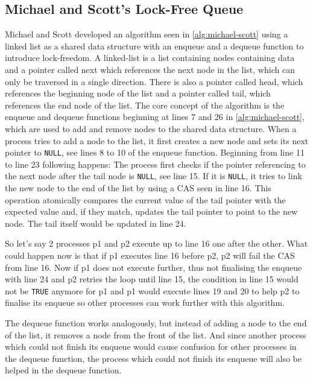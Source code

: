 \subsection{Michael and Scott's Lock-Free Queue}\label{subsec:michael-scott}

Michael and Scott developed an algorithm seen in \cref{alg:michael-scott} using a linked list as a shared data structure with an enqueue and a dequeue function to introduce lock-freedom. A linked-list is a list containing nodes containing data and a pointer called next which references the next node in the list, which can only be traversed in a single direction. There is also a pointer called head, which references the beginning node of the list and a pointer called tail, which references the end node of the list. The core concept of the algorithm is the enqueue and dequeue functions beginning at lines 7 and 26 in \cref{alg:michael-scott}, which are used to add and remove nodes to the shared data structure. When a process tries to add a node to the list, it first creates a new node and sets its next pointer to \texttt{NULL}, see lines 8 to 10 of the enqueue function. Beginning from line 11 to line 23 following happens: The process first checks if the pointer referencing to the next node after the tail node is \texttt{NULL}, see line 15. If it is \texttt{NULL}, it tries to link the new node to the end of the list by using a \ac{CAS} seen in line 16. This operation atomically compares the current value of the tail pointer with the expected value and, if they match, updates the tail pointer to point to the new node. The tail itself would be updated in line 24.  \cite{MichaelScottQueue}

So let's say 2 processes p1 and p2 execute up to line 16 one after the other. What could happen now is that if p1 executes line 16 before p2, p2 will fail the \ac{CAS} from line 16. Now if p1 does not execute further, thus not finalising the enqueue with line 24 and p2 retries the loop until line 15, the condition in line 15 would not be \texttt{TRUE} anymore for p1 and p1 would execute lines 19 and 20 to help p2 to finalise its enqueue so other processes can work further with this algorithm. \cite{MichaelScottQueue}

The dequeue function works analogously, but instead of adding a node to the end of the list, it removes a node from the front of the list. And since another process which could not finish its enqueue would cause confusion for other processes in the dequeue function, the process which could not finish its enqueue will also be helped in the dequeue function. \cite{MichaelScottQueue}

